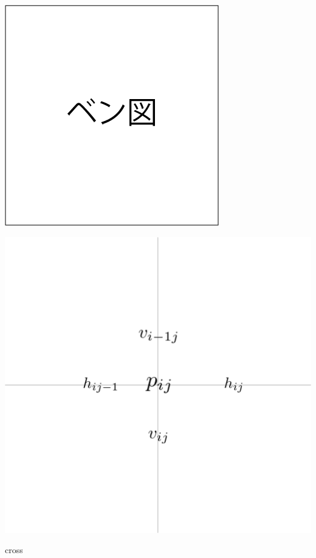 \begin{clearpagefigure}
  \includegraphics[width=0.85\linewidth,clip]{fig/vennDiagram.png}
  \caption{}
  \label{figure:VennDiagram}
\end{clearpagefigure}

\begin{clearpagefigure}
  \includegraphics[width=0.85\linewidth,clip]{fig/cross.png}
  \caption{cross}
  \label{figure:cross}
\end{clearpagefigure}

